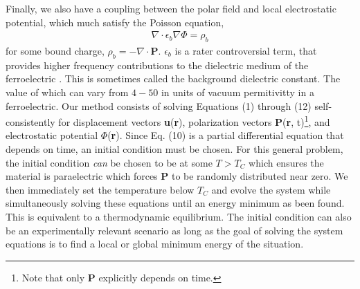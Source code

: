 \documentclass[16pt]{article} %
\begin{document}
%
Finally, we also have a coupling between the polar field and local electrostatic potential, which much satisfy the Poisson equation,
%
\begin{align}\tag{12}\label{eqn:poisson}
\nabla \cdot \epsilon_b \nabla \Phi = \rho_b
\end{align}
%
for some bound charge, $\rho_b  = - \nabla \cdot \textbf{P}$. $\epsilon_b$ is a rater controversial term, that provides higher frequency contributions to the dielectric medium of the ferroelectric \cite{Baroni2001}.
%
This is sometimes called the background dielectric constant.
%
The value of which can vary from $4 - 50$ \cite{Eliseev2015} in units of vacuum permitivitty in a ferroelectric.
%
Our method consists of solving Equations (1) through (12) self-consistently for displacement vectors \textbf{u}(\textbf{r}), polarization vectors \textbf{P}(\textbf{r}, t)\footnote{Note that only \textbf{P} explicitly depends on time.}, and electrostatic potential $\Phi$(\textbf{r}).
%
Since Eq. (10) is a partial differential equation that depends on time, an initial condition must be chosen.
%
For this general problem, the initial condition \emph{can} be chosen to be at some $T > T_C$ which ensures the material is paraelectric which forces $\textbf{P}$ to be randomly distributed near zero.
%
We then immediately set the temperature below $T_C$ and evolve the system while simultaneously solving these equations until an energy minimum as been found.
%
This is equivalent to a thermodynamic equilibrium. 
%
The initial condition can also be an experimentally relevant scenario as long as the goal of solving the system equations is to find a local or global minimum energy of the situation.
%

%
\end{document}
